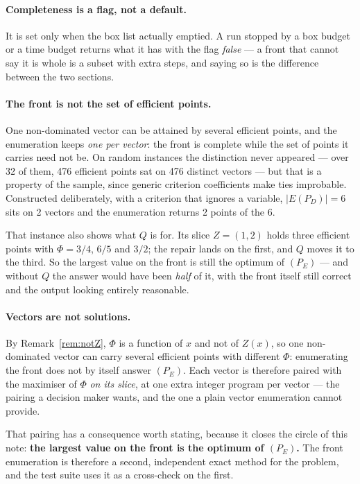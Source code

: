 \documentclass[11pt,a4paper]{article}
\newcommand{\Z}{Z}
\newcommand{\Dset}{D}
\newcommand{\E}{E(P_{\Dset})}
\begin{document}
\paragraph{Completeness is a flag, not a default.}  It is set only when the box
list actually emptied.  A run stopped by a box budget or a time budget returns
what it has with the flag \emph{false} --- a front that cannot say it is whole
is a subset with extra steps, and saying so is the difference between the two
sections.

\paragraph{The front is not the set of efficient points.}  One non-dominated
vector can be attained by several efficient points, and the enumeration keeps
\emph{one per vector}: the front is complete while the set of points it carries
need not be.  On random instances the distinction never appeared --- over 32 of
them, 476 efficient points sat on 476 distinct vectors --- but that is a
property of the sample, since generic criterion coefficients make ties
improbable.  Constructed deliberately, with a criterion that ignores a
variable, $|\E| = 6$ sits on 2 vectors and the enumeration returns 2 points of
the 6.

That instance also shows what $Q$ is for.  Its slice $\Z = (1,2)$ holds three
efficient points with $\Phi = 3/4$, $6/5$ and $3/2$; the repair lands on the
first, and $Q$ moves it to the third.  So the largest value on the front is
still the optimum of $(P_E)$ --- and without $Q$ the answer would have been
\emph{half} of it, with the front itself still correct and the output looking
entirely reasonable.

\paragraph{Vectors are not solutions.}  By Remark~\ref{rem:notZ}, $\Phi$ is a
function of $x$ and not of $\Z(x)$, so one non-dominated vector can carry
several efficient points with different $\Phi$: enumerating the front does not
by itself answer $(P_E)$.  Each vector is therefore paired with the maximiser of
$\Phi$ \emph{on its slice}, at one extra integer program per vector --- the
pairing a decision maker wants, and the one a plain vector enumeration cannot
provide.

That pairing has a consequence worth stating, because it closes the circle of
this note: \textbf{the largest value on the front is the optimum of $(P_E)$.}
The front enumeration is therefore a second, independent exact method for the
problem, and the test suite uses it as a cross-check on the first.
\end{document}
